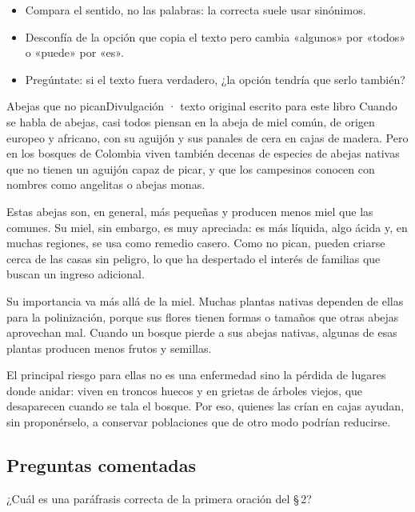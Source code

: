 
\begin{regla}
\begin{itemize}
  \item Compara el sentido, no las palabras: la correcta suele usar sinónimos.
  \item Desconfía de la opción que copia el texto pero cambia «algunos» por «todos» o «puede» por «es».
  \item Pregúntate: si el texto fuera verdadero, ¿la opción tendría que serlo también?
\end{itemize}
\end{regla}

\begin{texto}{Abejas que no pican}{Divulgación · texto original escrito para este libro}
\pa Cuando se habla de abejas, casi todos piensan en la abeja de miel común, de origen europeo y africano, con su aguijón y
sus panales de cera en cajas de madera. Pero en los bosques de Colombia viven también decenas de especies de abejas
nativas que no tienen un aguijón capaz de picar, y que los campesinos conocen con nombres como angelitas o abejas
monas.

\pa Estas abejas son, en general, más pequeñas y producen menos miel que las comunes. Su miel, sin embargo, es muy
apreciada: es más líquida, algo ácida y, en muchas regiones, se usa como remedio casero. Como no pican, pueden criarse
cerca de las casas sin peligro, lo que ha despertado el interés de familias que buscan un ingreso adicional.

\pa Su importancia va más allá de la miel. Muchas plantas nativas dependen de ellas para la polinización, porque sus
flores tienen formas o tamaños que otras abejas aprovechan mal. Cuando un bosque pierde a sus abejas nativas, algunas de
esas plantas producen menos frutos y semillas.

\pa El principal riesgo para ellas no es una enfermedad sino la pérdida de lugares donde anidar: viven en troncos huecos y
en grietas de árboles viejos, que desaparecen cuando se tala el bosque. Por eso, quienes las crían en cajas ayudan, sin
proponérselo, a conservar poblaciones que de otro modo podrían reducirse.
\end{texto}

\subsection{Preguntas comentadas}
\begin{comentada}{¿Cuál es una paráfrasis correcta de la primera oración del \S\,2?}
\end{comentada}

